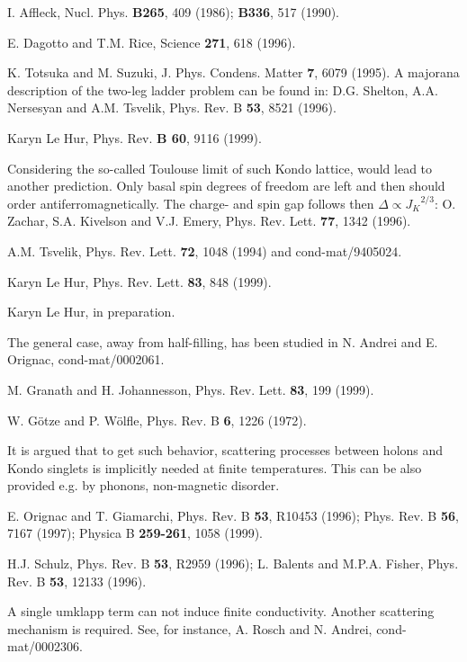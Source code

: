 \begin{references}
I. Affleck, Nucl. Phys. {\bf B265}, 409 (1986); {\bf B336}, 517 (1990).

E. Dagotto and T.M. Rice, Science {\bf 271}, 618 (1996).

K. Totsuka and M. Suzuki, J. Phys. Condens. Matter {\bf 7}, 
6079 (1995). A majorana description of the two-leg ladder problem
can be found in: D.G. Shelton, A.A. Nersesyan and A.M. Tsvelik,  
Phys. Rev. B {\bf 53}, 8521 (1996).

Karyn Le Hur, Phys. Rev. {\bf B 60}, 9116 (1999).

Considering the so-called 
Toulouse limit of such Kondo lattice, would lead to another
prediction. Only basal spin degrees of freedom are left and then
should order antiferromagnetically. The charge- and
spin gap follows then $\Delta\propto {J_K}^{2/3}$:
O. Zachar, S.A. Kivelson and V.J. Emery, Phys. Rev. Lett. {\bf 77}, 
1342 (1996).

A.M. Tsvelik,  Phys. Rev. Lett. {\bf 72}, 1048 (1994) and 
cond-mat/9405024.

Karyn Le Hur, Phys. Rev. Lett. {\bf 83}, 848 (1999).

Karyn Le Hur, in preparation.

The general case, away from half-filling, has been studied in
N. Andrei and E. Orignac, cond-mat/0002061.

M. Granath and H. Johannesson, Phys. Rev. Lett. {\bf 83}, 199 (1999).

W. G\" otze and P. W\" olfle, Phys. Rev. B {\bf 6}, 1226 (1972).

It is argued that to get such behavior, scattering processes between holons
and Kondo singlets is implicitly needed at finite temperatures. This
can be also provided e.g. by phonons, non-magnetic disorder.

E. Orignac and T. Giamarchi, Phys. Rev. B {\bf 53}, R10453 (1996); 
Phys. Rev. B {\bf 56}, 7167 (1997); Physica B {\bf 259-261}, 1058 (1999).

H.J. Schulz, Phys. Rev. B {\bf 53}, R2959 (1996); 
L. Balents and M.P.A. Fisher,  Phys. Rev. B {\bf 53}, 12133 (1996).

A single umklapp
term can not induce finite conductivity. Another scattering mechanism
is required. See, for instance, A. Rosch and N. Andrei, cond-mat/0002306.


\end{references}
